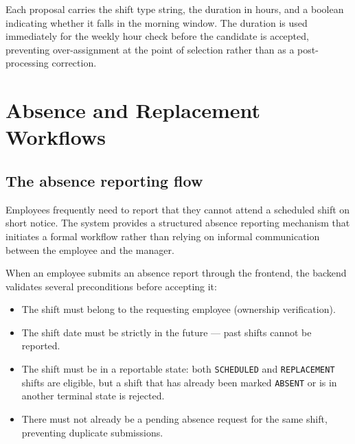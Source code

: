 \par Each proposal carries the shift type string, the duration in hours, and a boolean indicating whether it falls in the morning window. The duration is used immediately for the weekly hour check before the candidate is accepted, preventing over-assignment at the point of selection rather than as a post-processing correction.

\section{Absence and Replacement Workflows}
\label{sec:absence_and_replacement_workflows}

\subsection{The absence reporting flow}
\par Employees frequently need to report that they cannot attend a scheduled shift on short notice. The system provides a structured absence reporting mechanism that initiates a formal workflow rather than relying on informal communication between the employee and the manager.

\par When an employee submits an absence report through the frontend, the backend validates several preconditions before accepting it:

\begin{itemize}

    \item The shift must belong to the requesting employee (ownership verification).

    \item The shift date must be strictly in the future — past shifts cannot be reported.

    \item The shift must be in a reportable state: both \texttt{SCHEDULED} and \texttt{REPLACEMENT} shifts are eligible, but a shift that has already been marked \texttt{ABSENT} or is in another terminal state is rejected.

    \item There must not already be a pending absence request for the same shift, preventing duplicate submissions.

\end{itemize} 


